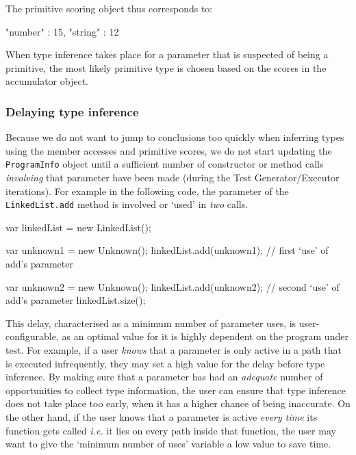 The primitive scoring object thus corresponds to:

\begin{code}[caption=Primitive scoring, label=primitivescore]
   {
      "number" : 15,
      "string" : 12
   }
\end{code}

When type inference takes place for a parameter that is suspected of being a primitive, the most likely primitive type is chosen based on the scores in the accumulator object.

\subsubsection{Delaying type inference}
Because we do not want to jump to conclusions too quickly when inferring types using the member accesses and primitive scores, we do not start updating the \texttt{ProgramInfo} object until a sufficient number of constructor or method calls \emph{involving} that parameter have been made (during the \textsf{Test Generator/Executor} iterations). For example in the following code, the parameter of the \texttt{LinkedList.add} method is involved or `used' in \emph{two} calls.

\begin{code}[caption=Parameter uses,label=uses]
var linkedList = new LinkedList();

var unknown1 = new Unknown();
linkedList.add(unknown1); // first `use' of add's parameter

var unknown2 = new Unknown();
linkedList.add(unknown2); // second `use' of add's parameter
linkedList.size();
\end{code}

This delay, characterised as a minimum number of parameter uses, is user-configurable, as an optimal value for it is highly dependent on the program under test. For example, if a user \emph{knows} that a parameter is only active in a path that is executed infrequently, they may set a high value for the delay before type inference. By making sure that a parameter has had an \emph{adequate} number of opportunities to collect type information, the user can ensure that type inference does not take place too early, when it has a higher chance of being inaccurate. On the other hand, if the user knows that a parameter is active \emph{every time} its function gets called \emph{i.e.} it lies on every path inside that function, the user may want to give the `minimum number of uses' variable a low value to save time.

